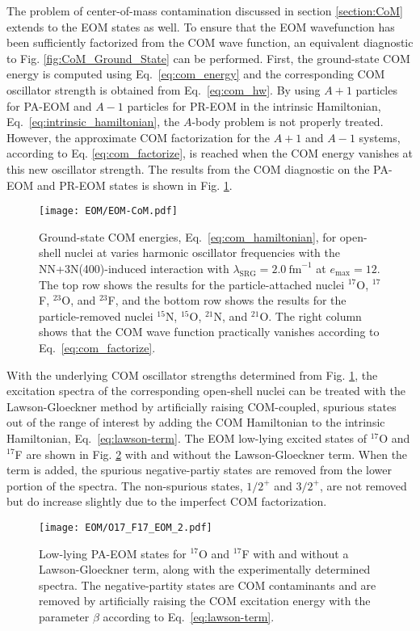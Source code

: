 \documentclass[thesis.tex]{subfiles}
\begin{document}
The problem of center-of-mass contamination discussed in section \ref{section:CoM} extends to the EOM states as well.  To ensure that the EOM wavefunction has been sufficiently factorized from the COM wave function, an equivalent diagnostic to Fig. \ref{fig:CoM_Ground_State} can be performed.  First, the ground-state COM energy is computed using Eq.\ \eqref{eq:com_energy} and the corresponding COM oscillator strength is obtained from Eq.\ \eqref{eq:com_hw}.  By using $A+1$ particles for PA-EOM and $A-1$ particles for PR-EOM in the intrinsic Hamiltonian, Eq.\ \eqref{eq:intrinsic_hamiltonian}, the $A$-body problem is not properly treated.  However, the approximate COM factorization for the $A+1$ and $A-1$ systems, according to Eq. \eqref{eq:com_factorize}, is reached when the COM energy vanishes at this new oscillator strength.  The results from the COM diagnostic on the PA-EOM and PR-EOM states is shown in Fig. \ref{fig:EOM_COM}.
\begin{figure}[h]
  \texttt{[image: EOM/EOM-CoM.pdf]}
  \caption{Ground-state COM energies, Eq.\ \eqref{eq:com_hamiltonian}, for open-shell nuclei at varies harmonic oscillator frequencies with the NN+3N(400)-induced interaction with $\lambda_{\mathrm{SRG}}=2.0\ \mathrm{fm}^{-1}$ at $e_{\mathrm{max}}=12$.  The top row shows the results for the particle-attached nuclei ${}^{17}$O, ${}^{17}$F, ${}^{23}$O, and ${}^{23}$F, and the bottom row shows the results for the particle-removed nuclei ${}^{15}$N, ${}^{15}$O, ${}^{21}$N, and ${}^{21}$O.  The right column shows that the COM wave function practically vanishes according to Eq.\ \eqref{eq:com_factorize}.}
  \label{fig:EOM_COM}
\end{figure}

With the underlying COM oscillator strengths determined from Fig. \ref{fig:EOM_COM}, the excitation spectra of the corresponding open-shell nuclei can be treated with the Lawson-Gloeckner method \cite{GLOECKNER1974313} by artificially raising COM-coupled, spurious states out of the range of interest by adding the COM Hamiltonian to the intrinsic Hamiltonian, Eq.\ \eqref{eq:lawson-term}.  The EOM low-lying excited states of $^{17}$O and $^{17}$F are shown in Fig. \ref{fig:O17F17_spectra} with and without the Lawson-Gloeckner term.  When the term is added, the spurious negative-partiy states are removed from the lower portion of the spectra.  The non-spurious states, $1/2^{+}$ and $3/2^{+}$, are not removed but do increase slightly due to the imperfect COM factorization.

\begin{figure}
  \texttt{[image: EOM/O17\_F17\_EOM\_2.pdf]}
  \caption{Low-lying PA-EOM states for $^{17}$O and $^{17}$F with and without a Lawson-Gloeckner term, along with the experimentally determined spectra.  The negative-partity states are COM contaminants and are removed by artificially raising the COM excitation energy with the parameter $\beta$ according to Eq.\ \eqref{eq:lawson-term}.}
  \label{fig:O17F17_spectra}
\end{figure}
\end{document}
